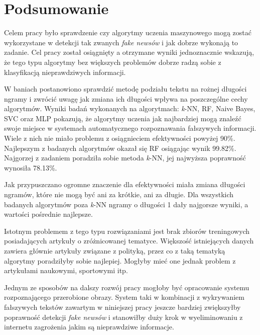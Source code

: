 \chapter{Podsumowanie}
Celem pracy było sprawdzenie czy algorytmy uczenia maszynowego mogą zostać wykorzystane
w detekcji tak zwanych \textit{fake newsów} i jak dobrze wykonają to zadanie. Cel pracy został osiągnięty
a otrzymane wyniki jednoznacznie wskazują, że tego typu algorytmy bez większych problemów dobrze 
radzą sobie z klasyfikacją nieprawdziwych informacji.


W baniach postanowiono sprawdzić metodę podziału tekstu na rożnej długości ngramy i zwrócić uwagę 
jak zmiana ich długości wpływa na poszczególne cechy algorytmów.
Wyniki badań wykonanych na algorytmach: \textit{k}-NN, RF, Naive Bayes,
SVC oraz MLP pokazują, że algorytmy uczenia jak najbardziej mogą znaleźć swoje miejsce w systemach
automatycznego rozpoznawania fałszywych informacji. Wiele z nich nie miało problemu z osiągnieciem 
efektywności powyżej 90\%. Najlepszym z badanych algorytmów okazał się RF osiągając
wynik 99.82\%. Najgorzej z zadaniem poradziła sobie metoda \textit{k}-NN, jej najwyższa 
poprawność wynosiła 78.13\%.

Jak przypuszczano ogromne znaczenie dla efektywności
miała zmiana długości ngramów, które nie mogą być ani za krótkie, ani za długie.
Dla wszystkich badanych algorytmów poza \textit{k}-NN ngramy o długości 1 dały najgorsze wyniki, a wartości
pośrednie najlepsze.

Istotnym problemem z tego typu rozwiązaniami jest brak zbiorów treningowych posiadających 
artykuły o zróżnicowanej tematyce. Większość istniejących danych zawiera głównie artykuły związane z 
polityką, przez co z taką tematyką algorytmy poradziłyby sobie najlepiej. Mogłyby mieć one jednak problem 
z artykułami naukowymi, sportowymi itp.

Jednym ze sposobów na dalszy rozwój pracy mogłoby być opracowanie systemu rozpoznającego 
przerobione obrazy. System taki w kombinacji z wykrywaniem fałszywych tekstów zawartym
w niniejszej pracy jeszcze bardziej zwiększyłby poprawność detekcji \textit{fake newsów} i stanowiłby 
duży krok w wyeliminowaniu z internetu zagrożenia jakim są nieprawdziwe informacje.